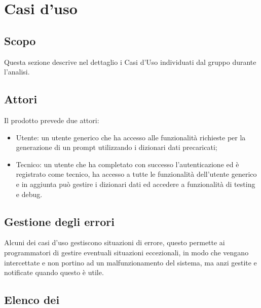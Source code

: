 \section{Casi d'uso}

\subsection{Scopo}
Questa sezione descrive nel dettaglio i Casi d’Uso individuati dal gruppo durante l'analisi.

\subsection{Attori}
Il prodotto prevede due attori:
\begin{itemize}
  \item Utente: un utente generico che ha accesso alle funzionalità richieste per la generazione di un prompt utilizzando i dizionari dati precaricati;
  \item Tecnico: un utente che ha completato con successo l'autenticazione ed è registrato come tecnico, ha accesso a tutte le funzionalità dell'utente generico e in aggiunta può gestire i dizionari dati ed accedere a funzionalità di testing e debug.
\end{itemize}

\subsection{Gestione degli errori}
Alcuni dei casi d'uso gestiscono situazioni di errore, questo permette ai programmatori di gestire eventuali situazioni eccezionali, in modo che vengano intercettate e non portino ad un malfunzionamento del sistema, ma anzi gestite e notificate quando questo è utile.

\subsection{Elenco dei }





















